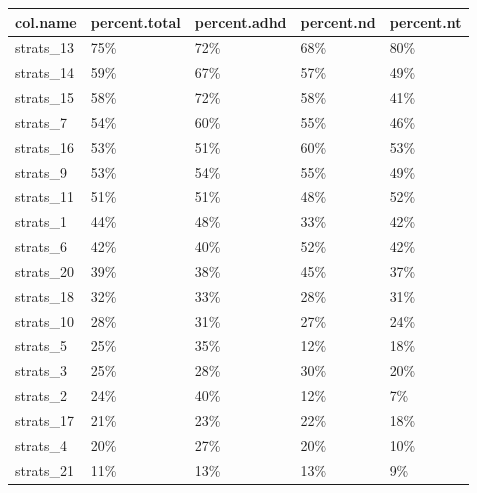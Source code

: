 \begin{table}[ht]
\centering
\begin{tabular}{lllll}
  \hline
col.name & percent.total & percent.adhd & percent.nd & percent.nt \\ 
  \hline
strats\_13 & 75\% & 72\% & 68\% & 80\% \\ 
  strats\_14 & 59\% & 67\% & 57\% & 49\% \\ 
  strats\_15 & 58\% & 72\% & 58\% & 41\% \\ 
  strats\_7 & 54\% & 60\% & 55\% & 46\% \\ 
  strats\_16 & 53\% & 51\% & 60\% & 53\% \\ 
  strats\_9 & 53\% & 54\% & 55\% & 49\% \\ 
  strats\_11 & 51\% & 51\% & 48\% & 52\% \\ 
  strats\_1 & 44\% & 48\% & 33\% & 42\% \\ 
  strats\_6 & 42\% & 40\% & 52\% & 42\% \\ 
  strats\_20 & 39\% & 38\% & 45\% & 37\% \\ 
  strats\_18 & 32\% & 33\% & 28\% & 31\% \\ 
  strats\_10 & 28\% & 31\% & 27\% & 24\% \\ 
  strats\_5 & 25\% & 35\% & 12\% & 18\% \\ 
  strats\_3 & 25\% & 28\% & 30\% & 20\% \\ 
  strats\_2 & 24\% & 40\% & 12\% & 7\% \\ 
  strats\_17 & 21\% & 23\% & 22\% & 18\% \\ 
  strats\_4 & 20\% & 27\% & 20\% & 10\% \\ 
  strats\_21 & 11\% & 13\% & 13\% & 9\% \\ 
   \hline
\end{tabular}
\end{table}
